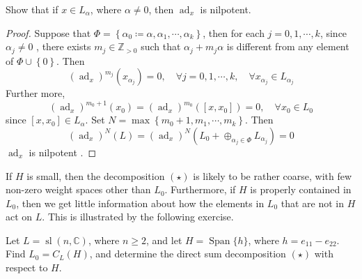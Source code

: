 \documentclass[../main.tex]{subfiles}
\begin{document}
\begin{exercise}{}{}
    Show that if \(  x \in L_{\alpha }  \), where \(  \alpha \neq 0  \), then \(  \operatorname{ad}_{x}  \) is nilpotent.   
\end{exercise}

\begin{proof}
 

   Suppose that \(  \Phi = \left\{ \alpha _0 \coloneqq \alpha , \alpha _1 ,\cdots ,\alpha _{k} \right\}  \), then for each \(  j= 0, 1,\cdots,k   \), since \(  \alpha _{j}\neq 0  \) , there exists \(  m_{j}\in \mathbb{Z} _{> 0}  \) such that \(  \alpha _{j}+ m_{j}\alpha   \) is different from any element of \(  \Phi \cup \left\{ 0 \right\}  \). Then \[
   \left( \operatorname{ad}_{x} \right)^{m_{j}}\left( x_{\alpha _{j}} \right)= 0, \quad \forall j = 0, 1,\cdots,k ,  \quad \forall x_{\alpha _{j}}\in L_{\alpha _{j}}  
   \]      Further more,  \[
   \left( \operatorname{ad}_{x} \right)^{m_{0}+ 1}\left( x_0 \right)= \left( \operatorname{ad}_{x} \right)^{m_0}   \left( \left[ x,x_0 \right]  \right)= 0, \quad \forall x_0 \in L_{0} 
   \]since \(  [x,x_0]\in L_{\alpha }  \). Set \(  N= \max \left\{ m_0+ 1,m_1,\cdots ,m_{k} \right\}  \). Then \[
   \left( \operatorname{ad}_{x} \right)^{N}\left( L \right)= \left( \operatorname{ad}_{x} \right)^{N}\left( L_0+ \oplus _{\alpha _{j}\in \Phi  }L_{\alpha _{j}} \right)= 0    
   \]   
\(  \operatorname{ad}_{x}  \) is nilpotent .
\end{proof}
\begin{remark}
If $H$ is small, then the decomposition $(\star)$ is likely to be rather coarse, with few non-zero weight spaces other than $L_0$. Furthermore, if $H$ is properly contained in $L_0$, then we get little information about how the elements in $L_0$ that are not in $H$ act on $L$. This is illustrated by the following exercise.
\end{remark}
\begin{exercise}{}{}
Let $L = \operatorname{sl}(n, \mathbb{C})$, where $n \ge 2$, and let $H = \operatorname{Span}\{h\}$, where $h = e_{11}-e_{22}$. Find $L_0 = C_L(H)$, and determine the direct sum decomposition $(\star)$ with respect to $H$.
\end{exercise}
\end{document}
